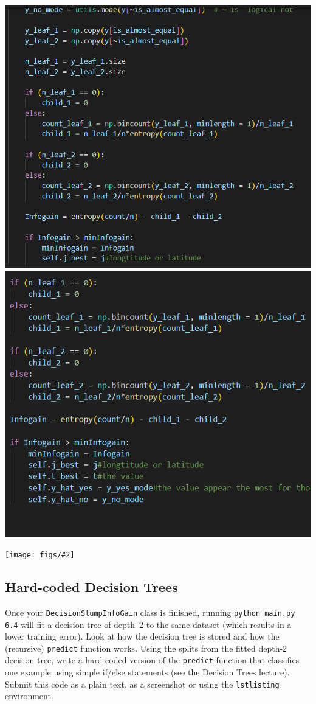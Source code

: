 \documentclass{article}
\def\blu#1{{\color{blu}#1}}
\newcommand{\centerfig}[2]{\begin{center}\texttt{[image: figs/\#2]}\end{center}}
\begin{document}
  \includegraphics{6_3_3}
  \includegraphics{6_3_4}
  \centerfig{.9}{q6_3_decisionBoundary.pdf}

  \clearpage

  \subsection{Hard-coded Decision Trees}

  Once your \texttt{DecisionStumpInfoGain} class is finished, running \texttt{python main.py 6.4} will fit
  a decision tree of depth~2 to the same dataset (which results in a lower training error).
  Look at how the decision tree is stored and how the (recursive) \texttt{predict} function works.
  \blu{Using the splits from the fitted depth-2 decision tree, write a hard-coded version of the \texttt{predict}
  function that classifies one example using simple if/else statements
  (see the Decision Trees lecture). Submit this code as a plain text, as a screenshot or using the \texttt{lstlisting} environment.}
\end{document}
